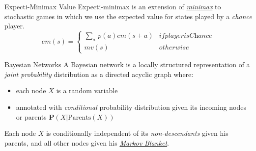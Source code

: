 \documentclass{cognito}
\begin{document}


\begin{note}{Expecti-Minimax Value}
	Expecti-minimax is an extension of \hyperref[note:Minimax Decision]{\it minimax} to stochastic games in which
	we use the expected value for states played by a \emph{chance} player.
	$$
		em(s) = \begin{cases*}
			\sum_a \, p(a) em(s + a) & if player is \textit{Chance}\\
			mv(s) & otherwise
		\end{cases*}
	$$
	\vspace{-5pt}
\end{note}

\begin{note}{Bayesian Networks}
	A Bayesian network is a locally structured representation of a \emph{joint probability} distribution
	as a directed acyclic graph where:\begin{itemize}
		\item each node $X$ is a random variable
		\item annotated with \emph{conditional} probability distribution given its incoming nodes or parents $\mathbf{P}(X|\text{Parents}(X))$
	\end{itemize}
	Each node $X$ is conditionally independent of its \emph{non-descendants} given his parents, and all other nodes
	given his \hyperref[note:Markov Blanket]{\emph{Markov Blanket}}.
	
\end{note}
\end{document}
